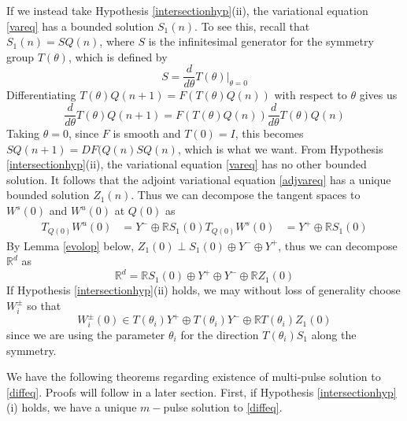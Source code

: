 \documentclass[12pt]{article}
\def\R{{\mathbb R}}
\begin{document}
If we instead take Hypothesis \ref{intersectionhyp}(ii), the variational equation \eqref{vareq} has a bounded solution $S_1(n)$. To see this, recall that $S_1(n) = S Q(n)$, where $S$ is the infinitesimal generator for the symmetry group $T(\theta)$, which is defined by
\begin{equation}
S = \frac{d}{d \theta} T(\theta)\Big|_{\theta = 0}
\end{equation}
Differentiating $T(\theta) Q(n+1) = F( T(\theta)Q(n))$ with respect to $\theta$ gives us
\[
\frac{d}{d \theta}T(\theta) Q(n+1) = F( T(\theta)Q(n)) \frac{d}{d \theta}T(\theta) Q(n)
\]
Taking $\theta = 0$, since $F$ is smooth and $T(0) = I$, this becomes $S Q(n+1) = DF(Q(n) S Q(n)$, which is what we want. From Hypothesis \ref{intersectionhyp}(ii), the variational equation \eqref{vareq} has no other bounded solution. It follows that the adjoint variational equation \eqref{adjvareq} has a unique bounded solution $Z_1(n)$. Thus we can decompose the tangent spaces to $W^s(0)$ and $W^u(0)$ at $Q(0)$ as
\begin{align*}
T_{Q(0)} W^u(0) &= Y^- \oplus \R S_1(0)
T_{Q(0)} W^s(0) &= Y^+ \oplus \R S_1(0)
\end{align*}
By Lemma \ref{evolop} below, $Z_1(0) \perp S_1(0) \oplus Y^- \oplus Y^+$, thus we can decompose $\R^d$ as
\begin{equation}\label{nontdecomp}
\R^d = \R S_1(0) \oplus Y^+ \oplus Y^- \oplus \R Z_1(0)
\end{equation}
If Hypothesis \ref{intersectionhyp}(ii) holds, we may without loss of generality choose $W_i^\pm$ so that 
\begin{equation}\label{W0loc}
W_i^\pm(0) \in T(\theta_i) Y^+ \oplus T(\theta_i) Y^- \oplus \R T(\theta_i) Z_1(0)
\end{equation}
since we are using the parameter $\theta_i$ for the direction $T(\theta_i) S_1$ along the symmetry.

We have the following theorems regarding existence of multi-pulse solution to \eqref{diffeq}. Proofs will follow in a later section. First, if Hypothesis \ref{intersectionhyp}(i) holds, we have a unique $m-$pulse solution to \eqref{diffeq}.
\end{document}
